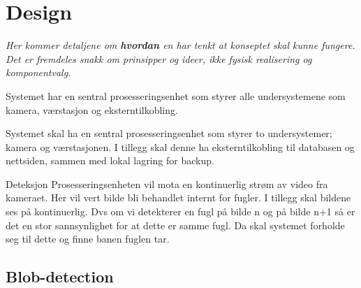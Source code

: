 \section{Design}
\label{sec:design}
\textit{Her kommer detaljene om \textbf{hvordan} en har tenkt at konseptet skal kunne fungere. Det er fremdeles snakk om prinsipper og ideer, ikke fysisk realisering og komponentvalg.}

Systemet har en sentral prosesseringsenhet som styrer alle undersystemene som kamera, værstasjon og eksterntilkobling. 

Systemet skal ha en sentral prosesseringsenhet som styrer to undersystemer; kamera og værstasjonen. I tillegg skal denne ha eksterntilkobling til databasen og nettsiden, sammen med lokal lagring for backup. 

Deteksjon
Prosesseringsenheten vil mota en kontinuerlig strøm av video fra kameraet. Her vil vert bilde bli behandlet internt for fugler. I tillegg skal bildene ses på kontinuerlig. Dvs om vi detekterer en fugl på bilde n og på bilde n+1 så er det en stor sannsynlighet for at dette er samme fugl. Da skal systemet forholde seg til dette og finne banen fuglen tar. 



\subsection{Blob-detection}




\subsection{}